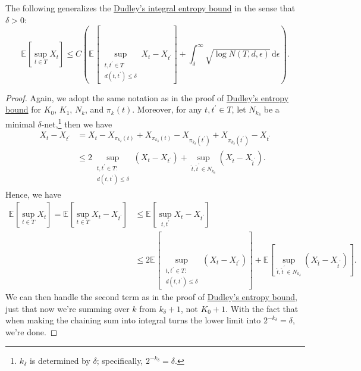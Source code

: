 \begin{corollary}\label{pf-col:Dudley-integral-entropy-bound-finite-resolution}
	The following generalizes the \hyperref[col:Dudley-integral-entropy-bound]{Dudley's integral entropy bound} in the sense that \(\delta > 0\):
	\[
		\mathbb{E}_{}\left[\sup _{t\in T} X_t \right]
		\leq C  \left( \mathbb{E}_{}\left[ \sup _{\substack{t, t^{\prime} \in T \\ d(t, t^{\prime} ) \leq \delta }} X_t - X_{t^{\prime} } \right] + \int_{\delta }^{\infty} \sqrt{\log N(T, d, \epsilon )} \,\mathrm{d}\epsilon \right) .
	\]
\end{corollary}
\begin{proof}
	Again, we adopt the same notation as in the proof of \hyperref[thm:Dudley-entropy-bound]{Dudley's entropy bound} for \(K_0\), \(K_1\), \(N_k\), and \(\pi _k(t)\). Moreover, for any \(t, t^{\prime} \in T\), let \(N_{k_{\delta }}\) be a minimal \(\delta \)-net,\footnote{\(k_\delta \) is determined by \(\delta \); specifically, \(2^{-k_\delta } = \delta \).} then we have
	\[
		\begin{split}
			X_t - X_{t^{\prime} }
			&= X_t - X_{\pi _{k_{\delta }}(t)} + X_{\pi _{k_{\delta }}(t)} - X_{\pi _{k_{\delta }}(t^{\prime} )} + X_{\pi _{k_{\delta }}(t^{\prime} )} - X_{t^{\prime} }\\
			&\leq 2 \sup _{\substack{t, t^{\prime} \in T \colon \\ d(t, t^{\prime} ) \leq \delta }} \left( X_t - X_{t^{\prime} } \right) + \sup _{\hat{t} , \hat{t} ^{\prime} \in N_{k_\delta }} \left( X_{\hat{t} } - X_{\hat{t} ^{\prime} } \right).
		\end{split}
	\]
	Hence, we have
	\[
		\begin{split}
			\mathbb{E}_{}\left[\sup _{t\in T} X_t \right]
			= \mathbb{E}_{}\left[\sup _{t\in T} X_t - X_{t^{\prime} } \right]
			&\leq \mathbb{E}_{}\left[\sup _{t, t^{\prime} } X_t - X_{t^{\prime} } \right]\\
			&\leq 2 \mathbb{E}_{}\left[ \sup _{\substack{t, t^{\prime} \in T \colon \\ d(t, t^{\prime} ) \leq \delta }} \left( X_t - X_{t^{\prime} } \right) \right] + \mathbb{E}_{}\left[\sup _{\hat{t} , \hat{t} ^{\prime} \in N_{k_\delta }} \left( X_{\hat{t} } - X_{\hat{t} ^{\prime} } \right) \right].
		\end{split}
	\]
	We can then handle the second term as in the proof of \hyperref[thm:Dudley-entropy-bound]{Dudley's entropy bound}, just that now we're summing over \(k\) from \(k_\delta + 1\), not \(K_0 + 1\). With the fact that when making the chaining sum into integral turns the lower limit into \(2^{-k_\delta } = \delta \), we're done.
\end{proof}
